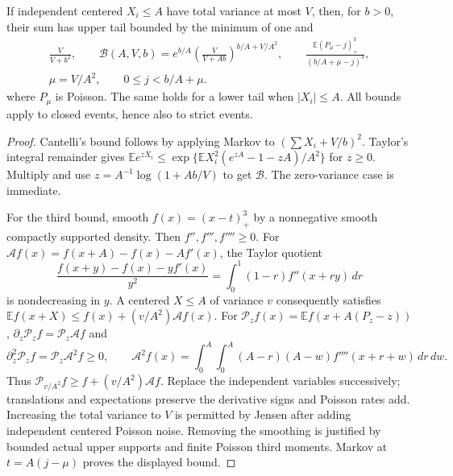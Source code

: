 \begin{lemma}\label{shortloc:tails}
If independent centered $X_i\le A$ have total variance at most $V$, then,
for $b>0$, their sum has upper tail bounded by the minimum of one and
\begin{equation}\label{shortloc:tailmin}
 \begin{gathered}
 \frac{V}{V+b^2},\qquad
 \mathcal B(A,V,b)=e^{b/A}\left(\frac{V}{V+Ab}\right)^{b/A+V/A^2},\qquad
 \frac{\mathbb E(P_\mu-j)_+^3}{(b/A+\mu-j)^3},\\
 \mu=V/A^2,\qquad 0\le j<b/A+\mu.
 \end{gathered}
\end{equation}
where $P_\mu$ is Poisson. The same holds for a lower tail when $|X_i|\le A$.
All bounds apply to closed events, hence also to strict events.
\end{lemma}
\begin{proof}
Cantelli's bound follows by applying Markov to $(\sum X_i+V/b)^2$.
Taylor's integral remainder gives
$\mathbb E e^{zX_i}\le\exp\{\mathbb E X_i^2(e^{zA}-1-zA)/A^2\}$
for $z\ge0$. Multiply and use $z=A^{-1}\log(1+Ab/V)$ to get $\mathcal B$.
The zero-variance case is immediate.

For the third bound, smooth $f(x)=(x-t)_+^3$ by a nonnegative smooth
compactly supported density. Then $f'',f''',f''''\ge0$. For
$\mathcal Af(x)=f(x+A)-f(x)-Af'(x)$, the Taylor quotient
\[
 \frac{f(x+y)-f(x)-yf'(x)}{y^2}
       =\int_0^1(1-r)f''(x+ry)\,dr
\]
is nondecreasing in $y$. A centered $X\le A$ of variance $v$ consequently
satisfies $\mathbb E f(x+X)\le f(x)+(v/A^2)\mathcal Af(x)$.
For $\mathcal P_zf(x)=\mathbb E f(x+A(P_z-z))$,
$\partial_z\mathcal P_zf=\mathcal P_z\mathcal Af$ and
\[
 \partial_z^2\mathcal P_zf=\mathcal P_z\mathcal A^2f\ge0,\qquad
 \mathcal A^2f(x)=\int_0^A\!\int_0^A(A-r)(A-w)f''''(x+r+w)\,dr\,dw.
\]
Thus $\mathcal P_{v/A^2}f\ge f+(v/A^2)\mathcal Af$. Replace the independent
variables successively; translations and expectations preserve the derivative
signs and Poisson rates add. Increasing the total variance to $V$ is permitted
by Jensen after adding independent centered Poisson noise. Removing the
smoothing is justified by bounded actual upper supports and finite Poisson
third moments. Markov at $t=A(j-\mu)$ proves the displayed bound.
\end{proof}


